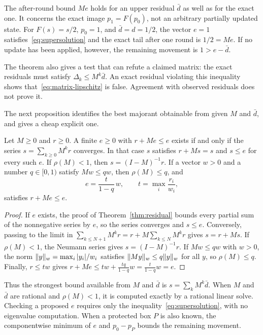 The after-round bound $Me$ holds for an upper residual $\bar d$ as well
as for the exact one. It concerns the exact image $p_1=F(p_0)$, not an
arbitrary partially updated state. For $F(s)=s/2$, $p_0=1$, and
$\bar d=d=1/2$, the vector $e=1$ satisfies~\eqref{eq:supersolution} and
the exact tail after one round is $1/2=Me$. If no update has been
applied, however, the remaining movement is $1>e-\bar d$.

The theorem also gives a test that can refute a claimed matrix: the
exact residuals must satisfy $\Delta_k\le M^k\bar d$. An exact residual
violating this inequality shows that~\eqref{eq:matrix-lipschitz} is
false. Agreement with observed residuals does not prove it.

The next proposition identifies the best majorant obtainable from given
$M$ and $\bar d$, and gives a cheap explicit one.

\begin{proposition}\label{prop:least-majorant}
Let $M\ge0$ and $r\ge0$. A finite $e\ge0$ with $r+Me\le e$ exists if
and only if the series $s=\sum_{k\ge0}M^kr$ converges. In that case $s$
satisfies $r+Ms=s$ and $s\le e$ for every such $e$. If $\rho(M)<1$, then
$s=(I-M)^{-1}r$. If a vector $w>0$ and a number $q\in[0,1)$ satisfy
$Mw\le qw$, then $\rho(M)\le q$, and
\[
 e=\frac{t}{1-q}\,w,\qquad t=\max_i\frac{r_i}{w_i},
\]
satisfies $r+Me\le e$.
\end{proposition}
\begin{proof}
If $e$ exists, the proof of Theorem~\ref{thm:residual} bounds every
partial sum of the nonnegative series by $e$, so the series converges and
$s\le e$. Conversely, passing to the limit in
$\sum_{k\le N+1}M^kr=r+M\sum_{k\le N}M^kr$ gives $s=r+Ms$. If
$\rho(M)<1$, the Neumann series gives $s=(I-M)^{-1}r$. If $Mw\le qw$ with
$w>0$, the norm $\lVert y\rVert_w=\max_i|y_i|/w_i$ satisfies
$\lVert My\rVert_w\le q\lVert y\rVert_w$ for all $y$, so $\rho(M)\le q$. Finally,
$r\le tw$ gives $r+Me\le tw+\frac{tq}{1-q}w=\frac{t}{1-q}w=e$.
\end{proof}

Thus the strongest bound available from $M$ and $\bar d$ is
$s=\sum_kM^k\bar d$. When $M$ and $\bar d$ are rational and
$\rho(M)<1$, it is computed exactly by a rational linear solve. Checking
a proposed $e$ requires only the inequality~\eqref{eq:supersolution},
with no eigenvalue computation. When a protected box $P$ is also known,
the componentwise minimum of $e$ and $p_0-p_P$ bounds the remaining
movement.

